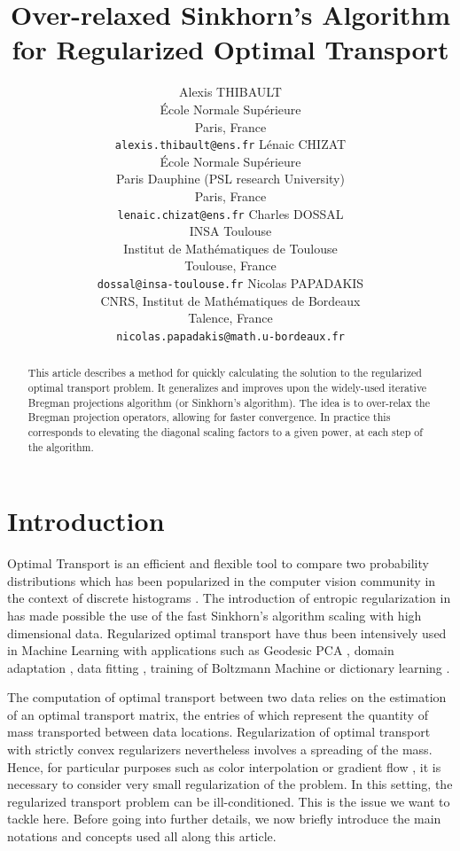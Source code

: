 \documentclass{article} %
\title{Over-relaxed Sinkhorn's Algorithm for Regularized Optimal Transport}
\author{
Alexis THIBAULT\\
\'Ecole Normale Sup\'erieure\\
Paris, France\\
\texttt{alexis.thibault@ens.fr}
 \And
L\'enaic CHIZAT\\
\'Ecole Normale Sup\'erieure\\ Paris Dauphine (PSL research University)\\
Paris, France\\
\texttt{lenaic.chizat@ens.fr}
 \AND
Charles DOSSAL\\
INSA Toulouse\\
Institut de Math\'ematiques de Toulouse\\
Toulouse,  France\\
\texttt{dossal@insa-toulouse.fr}
\And 
Nicolas PAPADAKIS\\
CNRS, Institut de Math\'ematiques de Bordeaux\\
Talence, France\\
\texttt{nicolas.papadakis@math.u-bordeaux.fr}
}
\theoremstyle{plain}
\theoremstyle{definition}
\theoremstyle{remark}
\begin{document}
\maketitle

\begin{abstract}
This article describes a method for quickly calculating the solution to the regularized optimal transport problem. It generalizes and improves upon the widely-used iterative Bregman projections algorithm (or Sinkhorn's algorithm). The idea is to over-relax the Bregman projection operators, allowing for faster convergence. In practice this corresponds to elevating the diagonal scaling factors to a given power, at each step of the algorithm.
\end{abstract}

\section{Introduction}
Optimal Transport is an efficient and flexible tool to compare two probability distributions which has been popularized in the computer vision community in the context of discrete histograms \cite{Rubner2000}. The introduction of entropic regularization in \cite{cuturi13} has made possible the use of the fast Sinkhorn's algorithm \cite{sinkhorn64}   scaling with high dimensional data. 
Regularized optimal transport have thus been intensively used  in  Machine Learning with applications such as   Geodesic PCA \cite{seguy2015principal}, domain adaptation \cite{2015arXiv150700504C}, data fitting \cite{2015arXiv150605439F},  training of Boltzmann Machine \cite{NIPS2016_6248}  or dictionary learning \cite{Rolet2016,2017arXiv170801955S}.

The computation of optimal transport between two data relies on the estimation of an optimal transport matrix, the entries of which represent the quantity of mass transported between  data locations. 
Regularization of optimal transport with strictly convex regularizers \cite{cuturi13, dessein2016}  nevertheless involves a spreading of the mass. Hence, for particular purposes such as color interpolation \cite{Rabin2014} or gradient flow \cite{2016arXiv160705816C}, it is  necessary  to consider very small regularization of the problem.
In this setting,  the regularized transport problem can be ill-conditioned. This is the issue  we want to tackle here.
Before going into further details, we now briefly introduce the main notations and concepts used all along this article.

 
\end{document}
